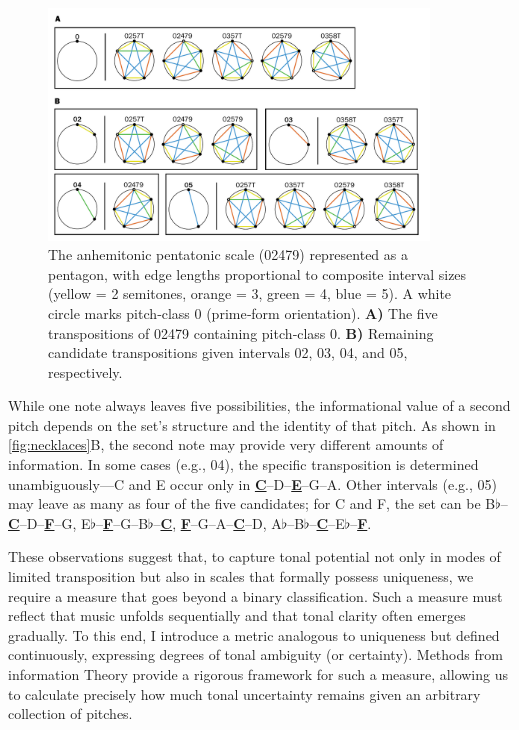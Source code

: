 \documentclass[10pt,twocolumn]{article}
\numberwithin{equation}{section} %
\begin{document}
    \begin{figure}[htbp]
        \centering
        \includegraphics[width=0.9\textwidth]{pentatonic-necklaces}%
        \caption{The anhemitonic pentatonic scale (02479) represented as a pentagon, with edge lengths proportional to composite interval sizes (yellow = 2 semitones, orange = 3, green = 4, blue = 5).
        A white circle marks pitch‑class 0 (prime‑form orientation).
        \textbf{A)} The five transpositions of 02479 containing pitch‑class 0.
        \textbf{B)} Remaining candidate transpositions given intervals 02, 03, 04, and 05, respectively.}
        \label{fig:necklaces}
    \end{figure}

    While one note always leaves five possibilities, the informational value of a second pitch depends on the set’s structure and the identity of that pitch.
    As shown in \autoref{fig:necklaces}B, the second note may provide very different amounts of information.
    In some cases (e.g., 04), the specific transposition is determined unambiguously—C and E occur only in \textbf{\uline{C}}–D–\textbf{\uline{E}}–G–A.
    Other intervals (e.g., 05) may leave as many as four of the five candidates; for C and F, the set can be
    B$\flat$–\textbf{\underline{C}}–D–\textbf{\underline{F}}–G,\quad
    E$\flat$–\textbf{\underline{F}}–G–B$\flat$–\textbf{\underline{C}},\quad
    \textbf{\underline{F}}–G–A–\textbf{\underline{C}}–D,\quad
    A$\flat$–B$\flat$–\textbf{\underline{C}}–E$\flat$–\textbf{\underline{F}}.

    These observations suggest that, to capture tonal potential not only in modes of limited transposition but also in scales that formally possess uniqueness, we require a measure that goes beyond a binary classification.
    Such a measure must reflect that music unfolds sequentially and that tonal clarity often emerges gradually.
    To this end, I introduce a metric analogous to uniqueness but defined continuously, expressing degrees of tonal ambiguity (or certainty).
    Methods from information Theory provide a rigorous framework for such a measure, allowing us to calculate precisely how much tonal uncertainty remains given an arbitrary collection of pitches.
\end{document}
